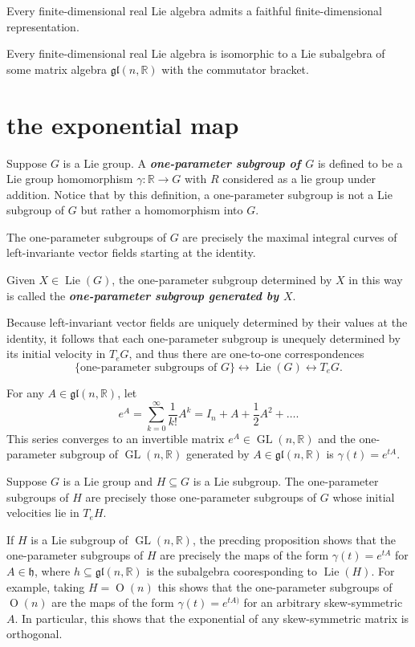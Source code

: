 \documentclass{article}
\numberwithin{equation}{section}
\newcommand{\R}{\mathbb{R}}
\newcommand{\hf}{\mathfrak{h}}
\newcommand{\glf}{\mathfrak{gl}}
\renewcommand{\O}{\operatorname{O}}
\DeclareMathOperator{\Lie}{\operatorname{Lie}}
\DeclareMathOperator{\GL}{GL}
\begin{document}
\begin{thm}
	Every finite-dimensional real Lie algebra admits a faithful finite-dimensional representation.
\end{thm}
\begin{coro}
	Every finite-dimensional real Lie algebra is isomorphic to a Lie subalgebra of some matrix algebra $\glf(n,\R)$ with the commutator bracket.
\end{coro}

\section{the exponential map}
\begin{defn}
	Suppose $G$ is a Lie group. A \textbf{\textit{one-parameter subgroup of $G$}} is defined to be a Lie group homomorphism $\gamma:\R\to G$ with $R$ considered as a lie group under addition. Notice that by this definition, a one-parameter subgroup is not a Lie subgroup of $G$ but rather a homomorphism into $G$.
\end{defn}
\begin{thm}
	The one-parameter subgroups of $G$ are precisely the maximal integral curves of left-invariante vector fields starting at the identity.
\end{thm}
\begin{defn}
	Given $X\in\Lie(G)$, the one-parameter subgroup determined by $X$ in this way is called the \textbf{\textit{one-parameter subgroup generated by $X$}}.
\end{defn}
Because left-invariant vector fields are uniquely determined by their values at the identity, it follows that each one-parameter subgroup is unequely determined by its initial velocity in $T_eG$, and thus there are one-to-one correspondences
\[\{\text{one-parameter subgroups of }G\}\leftrightarrow\Lie(G)\leftrightarrow T_eG.\]
\begin{prop}
	For any $A\in\glf(n,\R)$, let
	\[e^A=\sum_{k=0}^\infty\frac{1}{k!}A^k=I_n+A+\frac{1}{2}A^2+\ldots.\]
	This series converges to an invertible matrix $e^A\in\GL(n,\R)$ and the one-parameter subgroup of $\GL(n,\R)$ generated by $A\in\glf(n,\R)$ is $\gamma(t)=e^{tA}$.
\end{prop}
\begin{prop}
	Suppose $G$ is a Lie group and $H\subseteq G$ is a Lie subgroup. The one-parameter subgroups of $H$ are precisely those one-parameter subgroups of $G$ whose initial velocities lie in $T_eH$.
\end{prop}
\begin{example}
	If $H$ is a Lie subgroup of $\GL(n,\R)$, the precding proposition shows that the one-parameter subgroups of $H$ are precisely the maps of the form $\gamma(t)=e^{tA}$ for $A\in\hf$, where $h\subseteq\glf(n,\R)$ is the subalgebra cooresponding to $\Lie(H)$. For example, taking $H=\O(n)$ this shows that the one-parameter subgroups of $\O(n)$ are the maps of the form $\gamma(t)=e^{tA)}$ for an arbitrary skew-symmetric $A$. In particular, this shows that the exponential of any skew-symmetric matrix is orthogonal.
\end{example}
\end{document}
